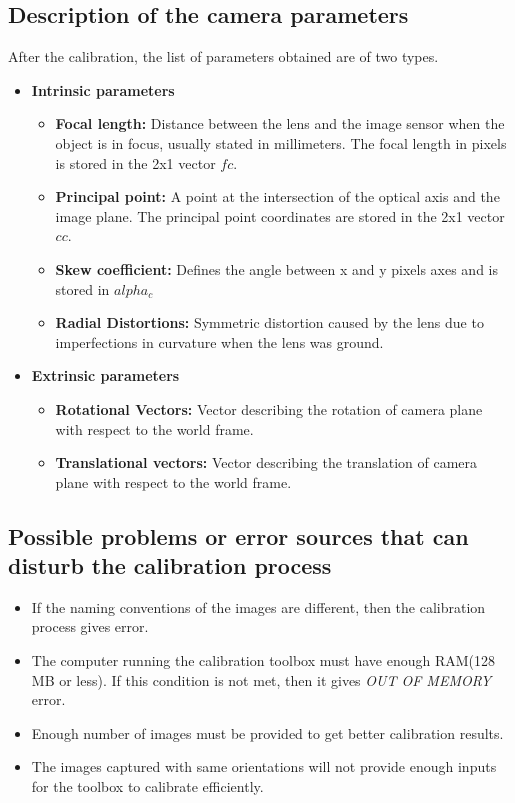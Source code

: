 \documentclass[11pt,a4paper]{article}
\begin{document}
				
				\subsection{Description of the camera parameters}
				After the calibration, the list of parameters obtained are of two types.
				\begin{itemize}
					\item \textbf{Intrinsic parameters}
					\begin{itemize}
						\item \textbf{Focal length:} Distance between the lens and the image sensor when the object is in focus, usually stated in millimeters. The focal length in pixels is stored in the 2x1 vector $fc$. 
						\item \textbf{Principal point:} A point at the intersection of the optical axis and the image plane. The principal point coordinates are stored in the 2x1 vector $cc$.
						\item \textbf{Skew coefficient:} Defines the angle between x and y pixels axes and is stored in $alpha_c$
						\item \textbf{Radial Distortions:} Symmetric distortion caused by the lens due to imperfections in curvature when the lens was ground.
					\end{itemize}
					\item \textbf{Extrinsic parameters}
					\begin{itemize}
						\item \textbf{Rotational Vectors:} Vector describing the rotation of camera plane with respect to the world frame.
						\item \textbf{Translational vectors:} Vector describing the translation of camera plane with respect to the world frame.
					\end{itemize}
				\end{itemize}
				
				
				\subsection{Possible problems or error sources that can disturb the calibration process}
				\begin{itemize}
					\item If the naming conventions of the images are different, then the calibration process gives error.
					\item The computer running the calibration toolbox must have enough RAM(128 MB or less). If this condition is not met, then it gives \textit{OUT OF MEMORY} error.
					\item Enough number of images must be provided to get better calibration results.
					\item The images captured with same orientations will not provide enough inputs for the toolbox to calibrate efficiently.
				\end{itemize}
				
\end{document}
